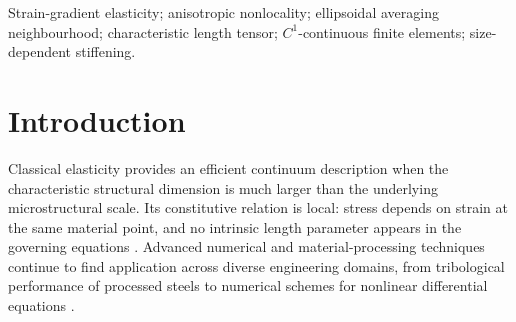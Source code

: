 \documentclass[final,3p,times,fleqn]{elsarticle}
\newcommand{\rev}[1]{\textcolor{revcolor}{#1}}
\begin{document}
\begin{frontmatter}
\begin{abstract}
\rev{This study presents an anisotropic strain-gradient elasticity framework in which direction-dependent microstructural interactions arise from a geometrically defined nonlocal domain. The resulting characteristic-length tensor comes from the second moments of a three-dimensional ellipsoidal averaging domain, giving it a direct geometric meaning similar to a fabric tensor. A positive-definite strain-gradient energy is discretized using smooth, continuously differentiable Hermite finite elements in one, two, and three dimensions, together with a corrected consistent mass formulation. For an axial characteristic length of 0.20 m and transverse lengths of 0.02 m, rotating the microstructural orientation produces a monotonic response. Static displacement increases by about 4\%, while the fundamental frequency decreases from 186.3 Hz to 173.1 Hz. The normalised frequency ranges from 1.054 to 0.979 relative to a volume-equivalent isotropic reference of 177.0 Hz. The axial length dominates the transverse contribution, producing a 5.8\% stiffness increase compared with only 0.5\% in the transverse-dominant case. A Directional Stiffening Index, measured against a volume-equivalent isotropic reference, is predominantly positive, ranging from 0\% to about 30\% across the anisotropy ratios and orientations studied. Only a few high-angle configurations show small negative values. These trends allow the stiffness and vibration frequency of anisotropic microstructured materials to be tailored through controlled variation of characteristic length and orientation.}
\end{abstract}


\begin{keyword}
Strain-gradient elasticity; anisotropic nonlocality; ellipsoidal averaging neighbourhood; characteristic length tensor; \(C^1\)-continuous finite elements; size-dependent stiffening.
\end{keyword}

\end{frontmatter}

\section{Introduction}
Classical elasticity provides an efficient continuum description when the characteristic structural dimension is much larger than the underlying microstructural scale. Its constitutive relation is local: stress depends on strain at the same material point, and no intrinsic length parameter appears in the governing equations \cite{Love1927}. Advanced numerical and material-processing techniques continue to find application across diverse engineering domains, from tribological performance of processed steels \cite{Yan2022Tribo} to numerical schemes for nonlinear differential equations \cite{Dong2024EJDE}.
\end{document}
